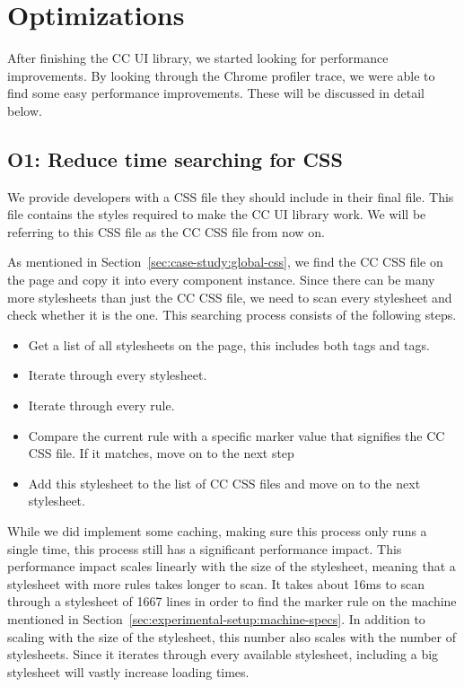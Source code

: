 \section{Optimizations}
After finishing the CC UI library, we started looking for performance improvements. By looking through the Chrome profiler trace, we were able to find some easy performance improvements. These will be discussed in detail below.

\subsection{O1: Reduce time searching for CSS}\label{sec:case-study:searching-for-css}
We provide developers with a CSS file they should include in their final  file. This file contains the styles required to make the CC UI library work. We will be referring to this CSS file as the CC CSS file from now on.

As mentioned in Section~\ref{sec:case-study:global-css}, we find the CC CSS file on the page and copy it into every component instance. Since there can be many more stylesheets than just the CC CSS file, we need to scan every stylesheet and check whether it is the one. This searching process consists of the following steps.

\begin{itemize}
  \item Get a list of all stylesheets on the page, this includes both  tags and  tags.
  \item Iterate through every stylesheet.
  \item Iterate through every rule.
  \item Compare the current rule with a specific marker value that signifies the CC CSS file. If it matches, move on to the next step
  \item Add this stylesheet to the list of CC CSS files and move on to the next stylesheet.
\end{itemize}

While we did implement some caching, making sure this process only runs a single time, this process still has a significant performance impact. This performance impact scales linearly with the size of the stylesheet, meaning that a stylesheet with more rules takes longer to scan. It takes about 16ms to scan through a stylesheet of 1667 lines in order to find the marker rule on the machine mentioned in Section~\ref{sec:experimental-setup:machine-specs}. In addition to scaling with the size of the stylesheet, this number also scales with the number of stylesheets. Since it iterates through every available stylesheet, including a big stylesheet will vastly increase loading times.

